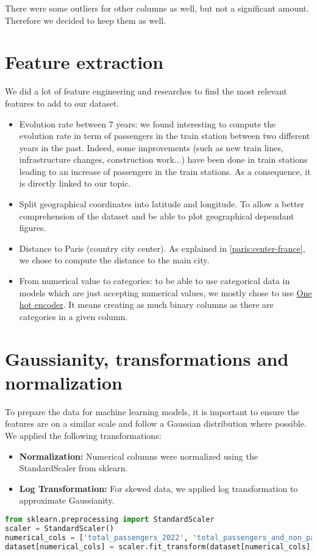 There were some outliers for other columns as well, but not a significant amount. Therefore we decided to keep them as well.


\section{Feature extraction}
We did a lot of feature engineering and researches to find the most relevant features to add to our dataset.
\begin{itemize}
    \item Evolution rate between 7 years: we found interesting to compute the evolution rate in term of passengers in the train station between two different years in the past. Indeed, some improvements (such as new train lines, infrastructure changes, construction work...) have been done in train stations leading to an increase of passengers in the train stations. As a consequence, it is directly linked to our topic.
    \item Split geographical coordinates into latitude and longitude. To allow a better comprehension of the dataset and be able to plot geographical dependant figures.
    \item Distance to Paris (country city center). As explained in \ref{paris:center-france}, we chose to compute the distance to the main city.
    \item From numerical value to categories: to be able to use categorical data in models which are just accepting numerical values, we mostly chose to use \href{https://scikit-learn.org/stable/modules/generated/sklearn.preprocessing.OneHotEncoder.html#sklearn.preprocessing.OneHotEncoder}{One hot encoder}. It means creating as much binary columns as there are categories in a given column.
\end{itemize}


\section{Gaussianity, transformations and normalization}
To prepare the data for machine learning models, it is important to ensure the features are on a similar scale and follow a Gaussian distribution where possible. We applied the following transformations:
\begin{itemize}
    \item \textbf{Normalization:} Numerical columns were normalized using the StandardScaler from sklearn.
    \item \textbf{Log Transformation:} For skewed data, we applied log transformation to approximate Gaussianity.
\end{itemize}
\begin{lstlisting}[language=python]
from sklearn.preprocessing import StandardScaler
scaler = StandardScaler()
numerical_cols = ['total_passengers_2022', 'total_passengers_and_non_passengers_2022', 'total_passengers_2015', 'total_passengers_and_non_passengers_2015']
dataset[numerical_cols] = scaler.fit_transform(dataset[numerical_cols])
\end{lstlisting}


